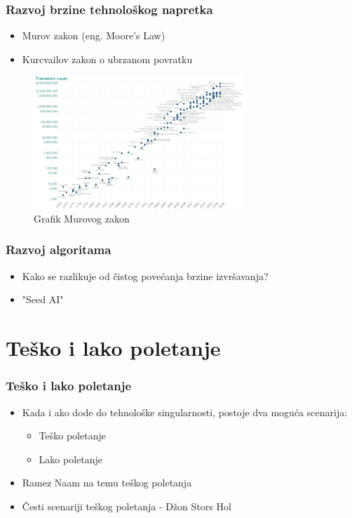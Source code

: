 \documentclass{beamer}
\begin{document}
\begin{frame}[fragile]\frametitle{Razvoj brzine tehnološkog napretka}
    \begin{itemize}	
        \item Murov zakon (eng. Moore's Law)
        \item Kurcvailov zakon o ubrzanom povratku
    \end{itemize}
    \begin{figure}[h!]
        \centering\includegraphics[height=5cm]{moore.png} 
        \caption{Grafik Murovog zakon}
        \label{fig:murovzakon}
    \end{figure}
\end{frame}


\begin{frame}[fragile]\frametitle{Razvoj algoritama}
    \begin{itemize}	
        \item Kako se razlikuje od čistog povećanja brzine izvršavanja?
        \item "Seed AI"
    \end{itemize}
\end{frame}

\section{Teško i lako poletanje}

\begin{frame}[fragile]\frametitle{Teško i lako poletanje}
	\begin{itemize}	
		\item Kada i ako dode do tehnološke singularnosti, postoje dva moguća scenarija:
  \begin{itemize}
  \item Teško poletanje 
  \item  Lako poletanje
  \end{itemize}
		\item Ramez Naam na temu teškog poletanja
		\item Česti scenariji teškog poletanja - Džon Stors Hol
	\end{itemize}
\end{frame}
\end{document}
